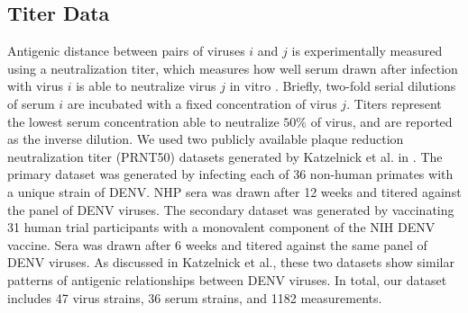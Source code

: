 \subsection*{Titer Data}

Antigenic distance between pairs of viruses $i$ and $j$ is experimentally measured using a neutralization titer, which measures how well serum drawn after infection with virus $i$ is able to neutralize virus $j$ in vitro \citep{russell1967dengue}.
Briefly, two-fold serial dilutions of serum $i$ are incubated with a fixed concentration of virus $j$.
Titers represent the lowest serum concentration able to neutralize $50\%$ of virus, and are reported as the inverse dilution.
We used two publicly available plaque reduction neutralization titer (PRNT50) datasets generated by Katzelnick et al. in \citep{katzelnick2015dengue}.
The primary dataset was generated by infecting each of 36 non-human primates with a unique strain of DENV.
NHP sera was drawn after 12 weeks and titered against the panel of DENV viruses.
The secondary dataset was generated by vaccinating 31 human trial participants with a monovalent component of the NIH DENV vaccine.
Sera was drawn after 6 weeks and titered against the same panel of DENV viruses.
As discussed in Katzelnick et al., these two datasets show similar patterns of antigenic relationships between DENV viruses.
In total, our dataset includes 47 virus strains, 36 serum strains, and 1182 measurements.

